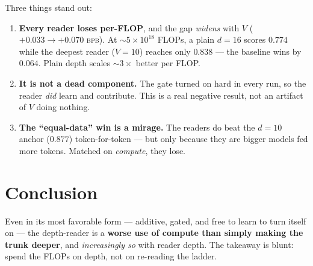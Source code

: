 \documentclass[11pt]{article}
\newcommand{\bpb}{\textsc{bpb}}
\begin{document}
Three things stand out:
\begin{enumerate}\setlength{\itemsep}{1pt}\setlength{\parsep}{0pt}\setlength{\topsep}{2pt}
  \item \textbf{Every reader loses per-FLOP}, and the gap \emph{widens} with $V$ ($+0.033 \to +0.070$
  \bpb). At $\sim\!5\times10^{18}$ FLOPs, a plain $d{=}16$ scores $0.774$ while the deepest reader
  ($V{=}10$) reaches only $0.838$ --- the baseline wins by $0.064$. Plain depth scales $\sim\!3\times$
  better per FLOP.
  \item \textbf{It is not a dead component.} The gate turned on hard in every run, so the reader
  \emph{did} learn and contribute. This is a real negative result, not an artifact of $V$ doing
  nothing.
  \item \textbf{The ``equal-data'' win is a mirage.} The readers do beat the $d{=}10$ anchor
  ($0.877$) token-for-token --- but only because they are bigger models fed more tokens. Matched on
  \emph{compute}, they lose.
\end{enumerate}

\section{Conclusion}

Even in its most favorable form --- additive, gated, and free to learn to turn itself on --- the
depth-reader is a \textbf{worse use of compute than simply making the trunk deeper}, and
\emph{increasingly so} with reader depth. The takeaway is blunt: spend the FLOPs on depth, not on
re-reading the ladder.
\end{document}
